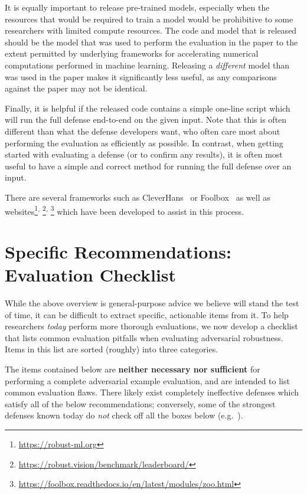 \documentclass{article} %
\begin{document}
It is equally important to release pre-trained models, especially when
the resources that would be required to train a model would be prohibitive
to some researchers with limited compute resources.
%
The code and model that is released should be the model that was used
to perform the evaluation in the paper to the extent permitted by
underlying frameworks for accelerating numerical computations
performed in machine learning.
%
Releasing a \emph{different}
model than was used in the paper makes it significantly less useful,
as any comparisons against the paper may not be identical.

Finally, it is helpful if the released code contains a simple one-line
script which will run the full defense end-to-end on the given input.
%
Note that this is often different than what the defense developers want,
who often care most about performing the evaluation as efficiently as
possible.
%
In contrast, when getting started with evaluating a defense (or to
confirm any results), it is
often most useful to have a simple and correct method for running the
full defense over an input.

There are several frameworks such as CleverHans~\citep{papernot2018cleverhans} or Foolbox~\citep{rauber2017foolbox}
as well as websites\footnote{\url{https://robust-ml.org}}\textsuperscript{,}%
\footnote{\url{https://robust.vision/benchmark/leaderboard/}}\textsuperscript{,}%
\footnote{\url{https://foolbox.readthedocs.io/en/latest/modules/zoo.html}}
which have been developed to assist in this process.


\section{Specific Recommendations: Evaluation Checklist}
\label{sec:dont_do_bad_science}
\label{sec:pleaseactuallythink}
While the above overview is general-purpose advice we believe will stand the
test of time, it can be difficult to extract specific, actionable items
from it.
%
To help researchers \emph{today} perform more thorough evaluations,
we now develop a checklist that lists common evaluation
pitfalls when evaluating adversarial robustness. Items in this list are
sorted (roughly) into three categories.

The items contained below are \textbf{neither necessary nor sufficient}
for performing a complete adversarial example evaluation, and are
intended to list common evaluation flaws.
%
There likely exist completely ineffective defenses which satisfy all of
the below recommendations; conversely, some of the strongest defenses
known today do \emph{not} check off all the boxes below (e.g.\ \citet{madry2017towards}).
\end{document}
